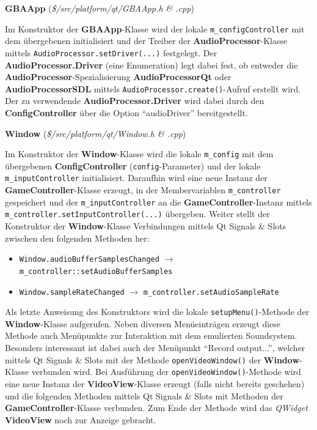 \documentclass[11pt,a4paper]{scrartcl}
\newcommand{\paratitlecode}[2] {
    \vspace{5mm}
    \large \textbf{#1} \normalsize(\textit{\${#2}})
    \vspace{2mm}\newline
}
\begin{document}
\paratitlecode{GBAApp}{/src/platform/qt/GBAApp.h \& .cpp}
Im Konstruktor der \textbf{GBAApp}-Klasse wird der lokale \verb|m_configController| mit dem \"ubergebenen initialisiert und der Treiber der \textbf{AudioProcessor}-Klasse mittels \verb|AudioProcessor.setDriver(...)| festgelegt. Der \textbf{AudioProcessor.Driver} (eine Enumeration) legt dabei fest, ob entweder die \textbf{AudioProcessor}-Spezialisierung \textbf{AudioProcessorQt} oder \textbf{AudioProcessorSDL} mittels \verb|AudioProcessor.create()|-Aufruf erstellt wird. Der zu verwendende \textbf{AudioProcessor.Driver} wird dabei durch den \textbf{ConfigController} \"uber die Option \enquote{audioDriver} bereitgestellt.

\newpage
\paratitlecode{Window}{/src/platform/qt/Window.h \& .cpp}
Im Konstruktor der \textbf{Window}-Klasse wird die lokale \verb|m_config| mit dem \"ubergebenen \textbf{ConfigController} (\verb|config|-Parameter) und der lokale \verb|m_inputController| initialisiert. Daraufhin wird eine neue Instanz der \textbf{GameController}-Klasse erzeugt, in der Membervariablen \verb|m_controller| gespeichert und der \verb|m_inputController| an die \textbf{GameController}-Instanz mittels \verb|m_controller.setInputController(...)| \"ubergeben. Weiter stellt der Konstruktor der \textbf{Window}-Klasse Verbindungen mittels Qt Signals \& Slots zwischen den folgenden Methoden her:

\begin{itemize}
    \item \verb|Window.audioBufferSamplesChanged| $\rightarrow$ \verb|m_controller::setAudioBufferSamples|
    \item \verb|Window.sampleRateChanged| $\rightarrow$ \verb|m_controller.setAudioSampleRate|
\end{itemize}

Als letzte Anweisung des Konstruktors wird die lokale \verb|setupMenu()|-Methode der \textbf{Window}-Klasse aufgerufen. Neben diversen Men\"ueintr\"agen erzeugt diese Methode auch Men\"upunkte zur Interaktion mit dem emulierten Soundsystem. Besonders interessant ist dabei auch der Men\"upunkt \enquote{Record output...}, welcher mittels Qt Signals \& Slots mit der Methode \verb|openVideoWindow()| der \textbf{Window}-Klasse verbunden wird. Bei Ausf\"uhrung der \verb|openVideoWindow()|-Methode wird eine neue Instanz der \textbf{VideoView}-Klasse erzeugt (falls nicht bereits geschehen) und die folgenden Methoden mittels Qt Signals \& Slots mit Methoden der \textbf{GameController}-Klasse verbunden. Zum Ende der Methode wird das \textit{QWidget} \textbf{VideoView} noch zur Anzeige gebracht.
\end{document}
